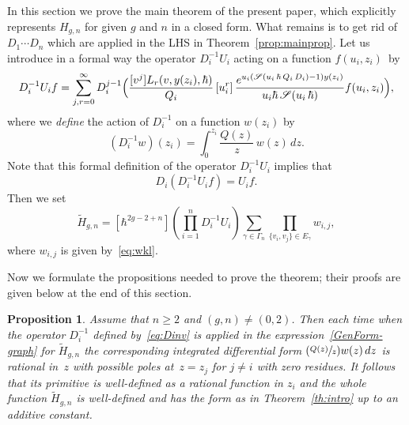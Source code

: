 \documentclass[11pt]{article}
\let\mathcal\mathscr
\newcommand{\Psfrac}[2]{(\sfrac{#1}{#2})}
\theoremstyle{plain}
\newtheorem{proposition}[theorem]{Proposition}
\theoremstyle{definition}
\theoremstyle{remark}
\newcommand{\cS}{\mathcal{S}}
\newcommand{\Hc}{H}
\begin{document}
In this section we prove the main theorem of the present paper, which explicitly represents $\Hc_{g,n}$ for given $g$ and $n$ in a closed form. What remains is to get rid of $D_1\cdots D_n$ which are applied in the LHS in Theorem~\ref{prop:mainprop}.
Let us introduce in a formal way the operator $D_{i}^{-1}U_i$ acting on a function $f(u_i,z_i)$~by\vspace*{-3pt}
\begin{equation}\label{eq:DinvU}
D_i^{-1}U_{i} f=\sum_{j,r=0}^\infty D_i^{j-1}\Bigl(\frac{[v^j]L_r(v,y(z_i),\hbar)}{Q_i}
\,[u_i^r]\, \frac{e^{u_i(\cS(u_i\,\hbar\,Q_i\,D_i)-1)y(z_i)}}{u_i\hbar\,\cS(u_i\,\hbar)}f(u_i,z_i) \Bigr),
\end{equation}
where we \emph{define} the action of $D_i^{-1}$ on a function $w(z_i)$ by\vspace*{-3pt}
\begin{equation}\label{eq:Dinv}
(D_i^{-1}w)(z_i)=\int_0^{z_i}\frac{Q(z)}{z}\,w(z)\,dz.
\end{equation}
Note that this formal definition of the operator $D_{i}^{-1}U_i$ implies that
\begin{equation}\label{eq:DDinv}
D_i\left(D_{i}^{-1}U_i f\right)=U_if.
\end{equation}
Then we set\vspace*{-3pt}
\begin{equation}
\label{GenForm-graph}
\widetilde H_{g,n} = [\hbar^{2g-2+n}] \left(\textstyle\prod_{i=1}^n D_i^{-1}U_i\right) \sum\limits_{\gamma\in\Gamma_n}\prod\limits_{\{v_i,v_j\}\in E_\gamma} w_{i,j},
\end{equation}
where $w_{i,j}$ is given by~\eqref{eq:wkl}.

Now we formulate the propositions needed to prove the theorem; their proofs are given below at the end of this section.

\begin{proposition}\label{prop:tildeH}
Assume that $n\ge2$ and $(g,n)\ne(0,2)$. Then each time when the operator $D_i^{-1}$ defined by~\eqref{eq:Dinv} is applied in the expression~\eqref{GenForm-graph} for $\widetilde H_{g,n}$ the corresponding integrated differential form $\Psfrac{Q(z)}{z}w(z)\,dz$ is rational in~$z$ with possible poles at~$z=z_j$ for $j\ne i$ with zero residues. It follows that its primitive is well-defined as a rational function in $z_i$ and the whole function $\widetilde H_{g,n}$ is well-defined and has the form as in Theorem~\ref{th:intro} up to an additive constant.
\end{proposition}
\end{document}
